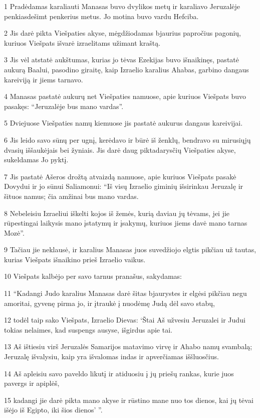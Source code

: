 \par 1 Pradėdamas karaliauti Manasas buvo dvylikos metų ir karaliavo Jeruzalėje penkiasdešimt penkerius metus. Jo motina buvo vardu Hefciba. 
\par 2 Jis darė pikta Viešpaties akyse, mėgdžiodamas bjaurius papročius pagonių, kuriuos Viešpats išvarė izraelitams užimant kraštą. 
\par 3 Jis vėl atstatė aukštumas, kurias jo tėvas Ezekijas buvo išnaikinęs, pastatė aukurą Baalui, pasodino giraitę, kaip Izraelio karalius Ahabas, garbino dangaus kareiviją ir jiems tarnavo. 
\par 4 Manasas pastatė aukurų net Viešpaties namuose, apie kuriuos Viešpats buvo pasakęs: “Jeruzalėje bus mano vardas”. 
\par 5 Dviejuose Viešpaties namų kiemuose jis pastatė aukurus dangaus kareivijai. 
\par 6 Jis leido savo sūnų per ugnį, kerėdavo ir būrė iš ženklų, bendravo su mirusiųjų dvasių iššaukėjais bei žyniais. Jis darė daug piktadarysčių Viešpaties akyse, sukeldamas Jo pyktį. 
\par 7 Jis pastatė Ašeros drožtą atvaizdą namuose, apie kuriuos Viešpats pasakė Dovydui ir jo sūnui Saliamonui: “Iš visų Izraelio giminių išsirinkau Jeruzalę ir šituos namus; čia amžinai bus mano vardas. 
\par 8 Nebeleisiu Izraeliui iškelti kojos iš žemės, kurią daviau jų tėvams, jei jie rūpestingai laikysis mano įstatymų ir įsakymų, kuriuos jiems davė mano tarnas Mozė”. 
\par 9 Tačiau jie neklausė, ir karalius Manasas juos suvedžiojo elgtis pikčiau už tautas, kurias Viešpats išnaikino prieš Izraelio vaikus. 
\par 10 Viešpats kalbėjo per savo tarnus pranašus, sakydamas: 
\par 11 “Kadangi Judo karalius Manasas darė šitas bjaurystes ir elgėsi pikčiau negu amoritai, gyvenę pirma jo, ir įtraukė į nuodėmę Judą dėl savo stabų, 
\par 12 todėl taip sako Viešpats, Izraelio Dievas: ‘Štai Aš užvesiu Jeruzalei ir Judui tokias nelaimes, kad suspengs ausyse, išgirdus apie tai. 
\par 13 Aš ištiesiu virš Jeruzalės Samarijos matavimo virvę ir Ahabo namų svambalą; Jeruzalę išvalysiu, kaip yra išvalomas indas ir apverčiamas iššluosčius. 
\par 14 Aš apleisiu savo paveldo likutį ir atiduosiu į jų priešų rankas, kurie juos pavergs ir apiplėš, 
\par 15 kadangi jie darė pikta mano akyse ir rūstino mane nuo tos dienos, kai jų tėvai išėjo iš Egipto, iki šios dienos’ ”. 
